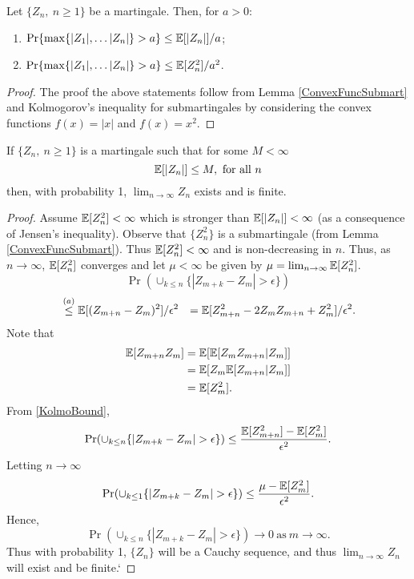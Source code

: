\documentclass[a4paper,10pt,english]{article}
\begin{document}
\begin{cor}
\label{MartingaleBoundCor}
Let $\{Z_n,~n \geq 1\}$ be a martingale. Then, for $a>0$:
\begin{enumerate}
\item $\Pr\{\max\{|Z_1|, \hdots |Z_n|\}>a\} \leq \mathbb{E}[|Z_n|]/a$;
\item $\Pr\{\max\{|Z_1|, \hdots |Z_n|\}>a\} \leq \mathbb{E}[Z_n^2]/a^2$.
\end{enumerate} 
\end{cor}
\begin{proof}
The proof the above statements follow from Lemma \ref{ConvexFuncSubmart} and Kolmogorov's inequality for submartingales by considering the convex functions $f(x)=|x|$ and $f(x)=x^2$. 
\end{proof}
\begin{thm}
\label{MartingaleConvergenceTheorem}
If $\{Z_n,~n \geq 1\}$ is a martingale such that for some $M< \infty$
\begin{equation*}
\mathbb{E}[|Z_n|] \leq M, ~ \text{for all}~ n
\end{equation*}
then, with probability 1, $\lim_{n \rightarrow \infty}Z_n$ exists and is finite.
\end{thm}
\begin{proof}
Assume $\mathbb{E}[Z_n^2]< \infty$ which is stronger than $\mathbb{E}[|Z_n|]< \infty$ (as a consequence of Jensen's inequality). Observe that $\{Z_n^2\}$ is a submartingale (from Lemma \ref{ConvexFuncSubmart}). Thus $\mathbb{E}[Z_n^2]<\infty$ and is non-decreasing in $n$. Thus, as $n \rightarrow \infty$, $\mathbb{E}[Z_n^2]$ converges and let $\mu<\infty$ be given by $\mu=\lim_{n \rightarrow \infty}\mathbb{E}[Z_n^2]$.
\begin{equation}
\label{KolmoBound}
\Pr(\cup_{k \leq n} \{|Z_{m+k}-Z_m|> \epsilon\} )
\end{equation}  
\begin{eqnarray*}
&\stackrel{(a)}{\leq }\mathbb{E}[(Z_{m+n}-Z_m)^2]/\epsilon^2
&=\mathbb{E}[Z_{m+n}^2-2Z_mZ_{m+n}+Z_m^2]/\epsilon^2.
\end{eqnarray*}
Note that 
\begin{eqnarray*}
\mathbb{E}[Z_{m+n}Z_m]&=\mathbb{E}[\mathbb{E}[Z_mZ_{m+n}|Z_m]]\\
&=\mathbb{E}[Z_m\mathbb{E}[Z_{m+n}|Z_m]]\\
&=\mathbb{E}[Z_m^2].
\end{eqnarray*}
From \ref{KolmoBound}, 
\begin{equation*}
\Pr(\cup_{k \leq n} \{|Z_{m+k}-Z_m|> \epsilon\}) \leq \frac{\E[Z_{m+n}^2]-\E[Z_m^2]}{\epsilon^2}.
\end{equation*}
Letting $n \rightarrow \infty$
\begin{equation*}
\Pr(\cup_{k \leq 1} \{|Z_{m+k}-Z_m|> \epsilon\}) \leq \frac{\mu-\E[Z_m^2]}{\epsilon^2}.
\end{equation*}
Hence,
\begin{equation*}
\Pr(\cup_{k \leq n} \{|Z_{m+k}-Z_m|> \epsilon\}) \rightarrow 0 ~\text{as}~ m \rightarrow \infty.
\end{equation*}
Thus with probability 1, $\{Z_n\}$ will be  a Cauchy sequence, and thus $\lim_{n \rightarrow \infty}Z_n$ will exist and be finite.`
\end{proof}
\end{document}

